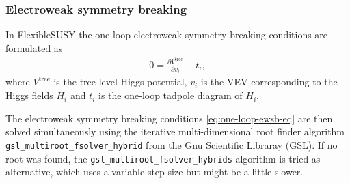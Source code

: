 \documentclass[final,3p,11pt,pdflatex]{elsarticle}
\makeatletter
\newcommand{\fs}{FlexibleSUSY\@\xspace}
\newcommand{\code}[1]{\lstinline|#1|}  %
\makeatother
\begin{document}
\subsubsection{Electroweak symmetry breaking}
\label{sec:ewsb}

In \fs the one-loop electroweak symmetry breaking conditions are
formulated as
%
\begin{align}
  0 = \frac{\partial V^\text{tree}}{\partial v_i} - t_i,
  \label{eq:one-loop-ewsb-eq}
\end{align}
%
where $V^\text{tree}$ is the tree-level Higgs potential, $v_i$ is the
VEV corresponding to the Higgs fields $H_i$ and $t_i$ is the one-loop
tadpole diagram of $H_i$.

The electroweak symmetry breaking conditions
\eqref{eq:one-loop-ewsb-eq} are then solved simultaneously using the
iterative multi-dimensional root finder algorithm
\code{gsl_multiroot_fsolver_hybrid} from the Gnu Scientific Libraray
(GSL).  If no root was found, the \code{gsl_multiroot_fsolver_hybrids}
algorithm is tried as alternative, which uses a variable step size but
might be a little slower.
\end{document}
